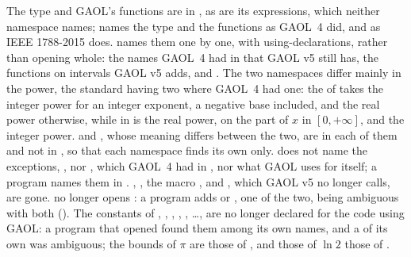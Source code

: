 The type  and GAOL's functions are in
, as are its expressions, which neither namespace names;
 names the type and the functions as GAOL~4 did, and
 as IEEE 1788-2015 does.\newinvfive{}  names
them one by one, with using-declarations, rather than opening
 whole: the names GAOL~4 had in  that GAOL v5
still has, the functions on intervals GAOL v5 adds, 
and . The two namespaces differ mainly in the power,
the standard having two where GAOL~4 had one: the  of 
takes the integer power for an integer exponent, a negative base included,
and the real power otherwise, while in   is
the real power, on the part of $x$ in $[0, +\infty]$, and  the
integer power.  and , whose meaning differs
between the two, are in each of them and not in , so that
each namespace finds its own only.  does not name the exceptions,
,  nor , which
GAOL~4 had in , nor what GAOL uses for itself; a program names
them in . , ,
the macro ,  and
, which GAOL v5 no longer calls, are gone.
 no longer opens : a program adds  or , one of the two,
 being ambiguous with both (). The
 constants of , ,
, , , \ldots, are no longer
declared for the code using GAOL: a program that opened  found
them among its own names, and a  of its own was ambiguous; the
bounds of $\pi$ are those of , and those of $\ln 2$
those of .

